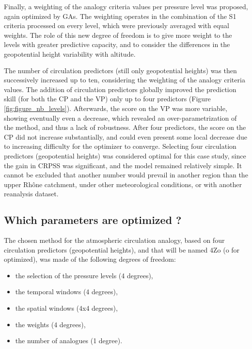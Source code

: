\documentclass[review]{elsarticle}
\begin{document}
Finally, a weighting of the analogy criteria values per pressure level was proposed, again optimized by GAs. The weighting operates in the combination of the S1 criteria processed on every level, which were previously averaged with equal weights. The role of this new degree of freedom is to give more weight to the levels with greater predictive capacity, and to consider the differences in the geopotential height variability with altitude. 

The number of circulation predictors (still only geopotential heights) was then successively increased up to ten, considering the weighting of the analogy criteria values. The addition of circulation predictors globally improved the prediction skill (for both the CP and the VP) only up to four predictors (Figure \ref{fig:figure_nb_levels}). Afterwards, the score on the VP was more variable, showing eventually even a decrease, which revealed an over-parametrization of the method, and thus a lack of robustness. After four predictors, the score on the CP did not increase substantially, and could even present some local decrease due to increasing difficulty for the optimizer to converge. Selecting four circulation predictors (geopotential heights) was considered optimal for this case study, since the gain in CRPSS was significant, and the model remained relatively simple. It cannot be excluded that another number would prevail in another region than the upper Rh\^{o}ne catchment, under other meteorological conditions, or with another reanalysis dataset.

\subsection{Which parameters are optimized ?}

The chosen method for the atmospheric circulation analogy, based on four circulation predictors (geopotential heights), and that will be named 4Zo (o for optimized), was made of the following degrees of freedom:

\begin{itemize}
	\setlength\itemsep{-4px}
	\item the selection of the pressure levels (4 degrees),
	\item the temporal windows (4 degrees),
	\item the spatial windows (4x4 degrees),
	\item the weights (4 degrees),
	\item the number of analogues (1 degree).
\end{itemize}
\end{document}
